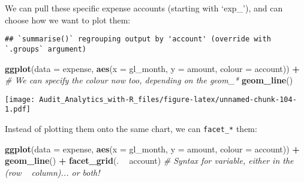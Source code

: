 \documentclass[
]{book}
\newenvironment{Shaded}{\begin{snugshade}}{\end{snugshade}}
\newcommand{\CommentTok}[1]{\textcolor[rgb]{0.56,0.35,0.01}{\textit{#1}}}
\newcommand{\DataTypeTok}[1]{\textcolor[rgb]{0.13,0.29,0.53}{#1}}
\newcommand{\KeywordTok}[1]{\textcolor[rgb]{0.13,0.29,0.53}{\textbf{#1}}}
\newcommand{\NormalTok}[1]{#1}
\newcommand{\OperatorTok}[1]{\textcolor[rgb]{0.81,0.36,0.00}{\textbf{#1}}}
\newcommand{\StringTok}[1]{\textcolor[rgb]{0.31,0.60,0.02}{#1}}
\begin{document}
We can pull these specific expense accounts (starting with `exp\_'), and can choose how we want to plot them:

\begin{Shaded}
\end{Shaded}

\begin{verbatim}
## `summarise()` regrouping output by 'account' (override with `.groups` argument)
\end{verbatim}

\begin{Shaded}
\begin{Highlighting}[]
\KeywordTok{ggplot}\NormalTok{(}\DataTypeTok{data =}\NormalTok{ expense, }\KeywordTok{aes}\NormalTok{(}\DataTypeTok{x =}\NormalTok{ gl_month, }\DataTypeTok{y =}\NormalTok{ amount, }\DataTypeTok{colour =}\NormalTok{ account)) }\OperatorTok{+}\StringTok{ }\CommentTok{# We can specify the colour now too, depending on the geom_*}
\StringTok{  }\KeywordTok{geom_line}\NormalTok{()}
\end{Highlighting}
\end{Shaded}

\texttt{[image: Audit\_Analytics\_with-R\_files/figure-latex/unnamed-chunk-104-1.pdf]}

Instead of plotting them onto the same chart, we can \texttt{facet\_*} them:

\begin{Shaded}
\begin{Highlighting}[]
\KeywordTok{ggplot}\NormalTok{(}\DataTypeTok{data =}\NormalTok{ expense, }\KeywordTok{aes}\NormalTok{(}\DataTypeTok{x =}\NormalTok{ gl_month, }\DataTypeTok{y =}\NormalTok{ amount, }\DataTypeTok{colour =}\NormalTok{ account)) }\OperatorTok{+}
\StringTok{  }\KeywordTok{geom_line}\NormalTok{() }\OperatorTok{+}
\StringTok{  }\KeywordTok{facet_grid}\NormalTok{(. }\OperatorTok{~}\StringTok{ }\NormalTok{account) }\CommentTok{# Syntax for variable, either in the (row ~ column)... or both!}
\end{Highlighting}
\end{Shaded}
\end{document}
